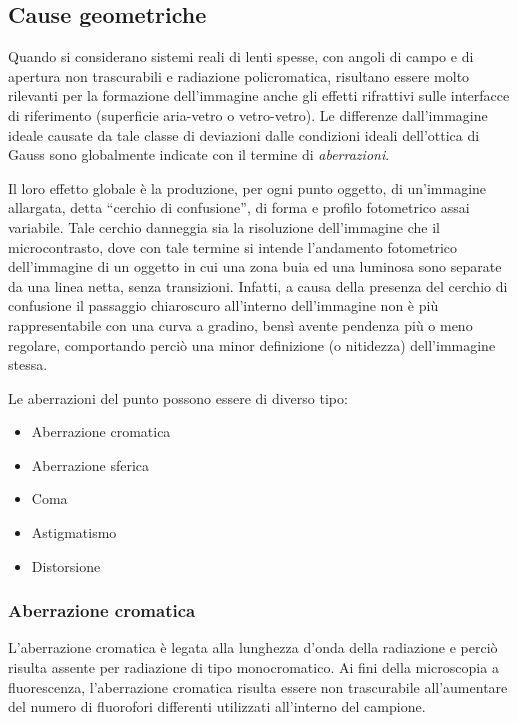 \subsection {Cause geometriche}

Quando si considerano sistemi reali di lenti spesse, con angoli di campo e di apertura non trascurabili e radiazione policromatica, risultano essere molto rilevanti per la formazione dell'immagine anche gli effetti rifrattivi sulle interfacce di riferimento (superficie aria-vetro o vetro-vetro).
Le differenze dall'immagine ideale causate da tale classe di deviazioni dalle condizioni ideali dell'ottica di Gauss sono globalmente indicate con il termine di \textit{aberrazioni}.

Il loro effetto globale è la produzione, per ogni punto oggetto, di un'immagine allargata, detta ``cerchio di confusione'', di forma e profilo fotometrico assai variabile. 
Tale cerchio danneggia sia la risoluzione dell'immagine che il microcontrasto, dove con tale termine si intende l'andamento fotometrico dell'immagine di un oggetto in cui una zona buia ed una luminosa sono separate da una linea netta, senza transizioni. 
Infatti, a causa della presenza del cerchio di confusione il passaggio chiaroscuro all'interno dell'immagine non è più rappresentabile con una curva a gradino, bensì avente pendenza più o meno regolare, comportando perciò una minor definizione (o nitidezza) dell'immagine stessa.

Le aberrazioni del punto possono essere di diverso tipo:
\begin{itemize}
 \item Aberrazione cromatica
 
 \item Aberrazione sferica
 
 \item Coma
 
 \item Astigmatismo
 
 \item Distorsione
\end{itemize}


\subsubsection{Aberrazione cromatica}
L'aberrazione cromatica è legata alla lunghezza d'onda della radiazione e perciò risulta assente per radiazione di tipo monocromatico. 
Ai fini della microscopia a fluorescenza, l'aberrazione cromatica risulta essere non trascurabile all'aumentare del numero di fluorofori differenti utilizzati all'interno del campione.

